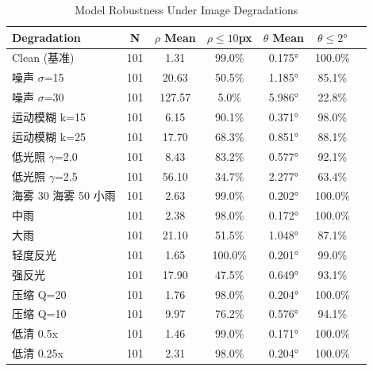 \begin{table}[htbp]
\centering
\caption{Model Robustness Under Image Degradations}
\label{tab:degradation_robustness}
\begin{tabular}{lcccccc}
\toprule
Degradation & N & $\rho$ Mean & $\rho \leq 10$px & $\theta$ Mean & $\theta \leq 2°$ \\
\midrule
Clean (基准) & 101 & 1.31 & 99.0\% & 0.175° & 100.0\% \\
噪声 $\sigma$=15 & 101 & 20.63 & 50.5\% & 1.185° & 85.1\% \\
噪声 $\sigma$=30 & 101 & 127.57 & 5.0\% & 5.986° & 22.8\% \\
运动模糊 k=15 & 101 & 6.15 & 90.1\% & 0.371° & 98.0\% \\
运动模糊 k=25 & 101 & 17.70 & 68.3\% & 0.851° & 88.1\% \\
低光照 $\gamma$=2.0 & 101 & 8.43 & 83.2\% & 0.577° & 92.1\% \\
低光照 $\gamma$=2.5 & 101 & 56.10 & 34.7\% & 2.277° & 63.4\% \\
海雾 30%
海雾 50%
小雨 & 101 & 2.63 & 99.0\% & 0.202° & 100.0\% \\
中雨 & 101 & 2.38 & 98.0\% & 0.172° & 100.0\% \\
大雨 & 101 & 21.10 & 51.5\% & 1.048° & 87.1\% \\
轻度反光 & 101 & 1.65 & 100.0\% & 0.201° & 99.0\% \\
强反光 & 101 & 17.90 & 47.5\% & 0.649° & 93.1\% \\
压缩 Q=20 & 101 & 1.76 & 98.0\% & 0.204° & 100.0\% \\
压缩 Q=10 & 101 & 9.97 & 76.2\% & 0.576° & 94.1\% \\
低清 0.5x & 101 & 1.46 & 99.0\% & 0.171° & 100.0\% \\
低清 0.25x & 101 & 2.31 & 98.0\% & 0.204° & 100.0\% \\
\bottomrule
\end{tabular}
\end{table}